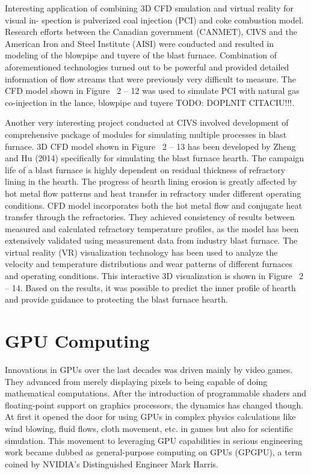 Interesting application of combining 3D CFD smulation and virtual reality for visual in- spection is pulverized coal injection (PCI) and coke combustion model. Research efforts between the Canadian government (CANMET), CIVS and the American Iron and Steel Institute (AISI) were conducted and resulted in modeling of the blowpipe and tuyere of the blast furnace. Combination of aforementioned technologies turned out to be powerful and provided detailed information of flow streams that were previously very difficult to measure. The CFD model shown in Figure~ 2 – 12 was used to simulate PCI with natural gas co-injection in the lance, blowpipe and tuyere TODO: DOPLNIT CITACIU!!!.

Another very interesting project conducted at CIVS involved development of comprehensive package of modules for simulating multiple processes in blast furnace. 3D CFD model shown in Figure~ 2 – 13 has been developed by Zheng and Hu (2014) specifically for simulating the blast furnace hearth. The campaign life of a blast furnace is highly dependent on residual thickness of refractory lining in the hearth. The progress of hearth lining erosion is greatly affected by hot metal flow patterns and heat transfer in refractory under different operating conditions. CFD model incorporates both the hot metal flow and conjugate heat transfer through the refractories. They achieved consistency of results between measured and calculated refractory temperature profiles, as the model has been extensively validated using measurement data from industry blast furnace. The virtual reality (VR) visualization technology has been used to analyze the velocity and temperature distributions and wear patterns of different furnaces and operating conditions. This interactive 3D visualization is shown in Figure~ 2 – 14. Based on the results, it was possible to predict the inner profile of hearth and provide guidance to protecting the blast furnace hearth.



\section{GPU Computing}

\label{gpu-computing}
Innovations in GPUs over the last decades was driven mainly by video games. They advanced from merely displaying pixels to being capable of doing mathematical computations. After the introduction of programmable shaders and floating-point support on graphics processors, the dynamics has changed though. At first it opened the door for using GPUs in complex physics calculations like wind blowing, fluid flows, cloth movement, etc. in games but also for scientific simulation. This movement to leveraging GPU capabilities in serious engineering work became dubbed as general-purpose computing on GPUs (GPGPU), a term coined by NVIDIA's Distinguished Engineer Mark Harris.

